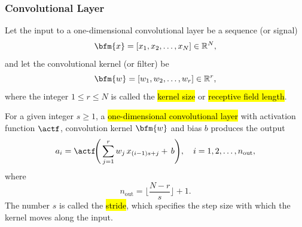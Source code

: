 \subsubsection{Convolutional Layer}
Let the input to a one-dimensional convolutional layer be a sequence (or signal)
$$
\bfm{x} = [x_1, x_2, \ldots, x_N] \in \mathbb{R}^N,
$$
and let the convolutional kernel (or filter) be
$$
\bfm{w} = [w_1, w_2, \ldots, w_r] \in \mathbb{R}^r,
$$
where the integer $1\le r\le N$ is called the \hl{kernel size} or \hl{receptive field length}. 
\begin{definition}
For a given integer $s \ge 1$, a \hl{one-dimensional convolutional layer} with activation function $\actf$, convolution kernel $\bfm{w}$ and bias $b$ produces the output
\[
a_i = \actf\!\Bigg(\sum_{j=1}^{r} w_j\, x_{(i-1)s + j} +\,b\Bigg),
\quad i = 1, 2, \ldots, n_{\text{out}},
\]
where
\[
n_{\text{out}} = \Big\lfloor \frac{N - r}{s} \Big\rfloor + 1.
\]
The number $s$ is called the \hl{stride}, which specifies the step size with which the kernel moves along the input.
\end{definition}

